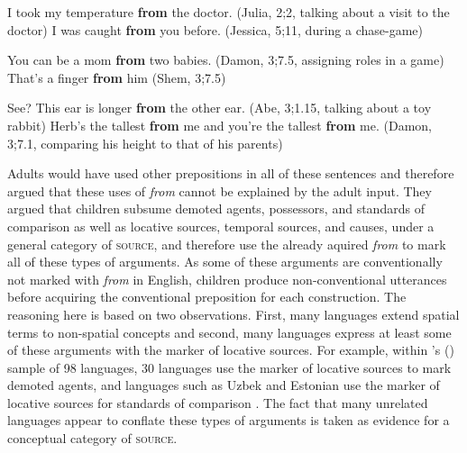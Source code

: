 \documentclass[lucida]{sp} %
\newcommand{\possessivecite}[1]{\citeauthor{#1}'s (\citeyear{#1})}
\begin{document}
\begin{exe}
\ex \label{ex:child-from-agt} \begin{xlist}
\ex I took my temperature \textbf{from} the doctor. (Julia, 2;2, talking about a visit to the doctor)
\ex I was caught \textbf{from} you before. (Jessica, 5;11, during a chase-game)
\end{xlist}
\ex \label{ex:child-from-poss}  \begin{xlist}
\ex You can be a mom \textbf{from} two babies. (Damon, 3;7.5, assigning roles in a game)
\ex That's a finger \textbf{from} him (Shem, 3;7.5)
\end{xlist}
\ex \label{ex:child-from-comp} \begin{xlist}
\ex See? This ear is longer \textbf{from} the other ear. (Abe, 3;1.15, talking about a toy rabbit)
\ex Herb's the tallest \textbf{from} me and you're the tallest \textbf{from} me. (Damon, 3;7.1, comparing his height to that of his parents)
\end{xlist}
\end{exe}
Adults would have used other prepositions in all of these sentences and \cite{clark1989a} therefore argued that these uses of \textit{from} cannot be explained by the adult input. They argued that children subsume demoted agents, possessors, and standards of comparison as well as locative sources, temporal sources, and causes, under a general category of \textsc{source}, and therefore use the already aquired \textit{from} to mark all of these types of arguments. As some of these arguments are conventionally not marked with \textit{from} in English, children produce non-conventional utterances before acquiring the conventional preposition for each construction. The reasoning here is based on two observations. First, many languages extend spatial terms to non-spatial concepts and second, many languages express at least some of these arguments with the marker of locative sources. For example, within \possessivecite{palancar2002} sample of 98 languages, 30 languages use the marker of locative sources to mark demoted agents, and languages such as Uzbek and Estonian use the marker of locative sources for standards of comparison \citep{stassen1985}.  The fact that many unrelated languages appear to conflate these types of arguments is taken as evidence for a conceptual category of \textsc{source}.
\end{document}
